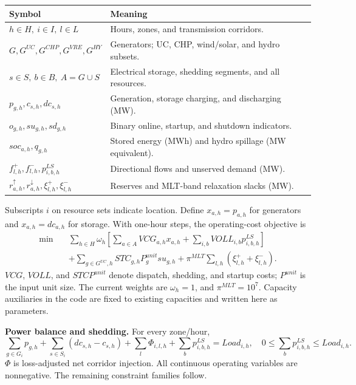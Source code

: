 \documentclass[11pt,a4paper]{article}
\newcommand{\family}[1]{\textbf{#1}}
\begin{document}
\begin{center}\small
\begin{tabularx}{\linewidth}{@{}lX@{}}\toprule
Symbol & Meaning \\\midrule
$h\in H,\ i\in I,\ l\in L$ & Hours, zones, and transmission corridors.\\
$G,G^{UC},G^{CHP},G^{VRE},G^{HY}$ & Generators; UC, CHP, wind/solar, and hydro subsets.\\
$s\in S,\ b\in B,\ A=G\cup S$ & Electrical storage, shedding segments, and all resources.\\
$p_{g,h},c_{s,h},dc_{s,h}$ & Generation, storage charging, and discharging (MW).\\
$o_{g,h},su_{g,h},sd_{g,h}$ & Binary online, startup, and shutdown indicators.\\
$soc_{a,h},q_{g,h}$ & Stored energy (MWh) and hydro spillage (MW equivalent).\\
$f^+_{l,h},f^-_{l,h},p^{LS}_{i,b,h}$ & Directional flows and unserved demand (MW).\\
$r^\uparrow_{a,h},r^\downarrow_{a,h},\xi^+_{l,h},\xi^-_{l,h}$ & Reserves and MLT-band relaxation slacks (MW).\\\bottomrule
\end{tabularx}
\end{center}
Subscripts $i$ on resource sets indicate location. Define $x_{a,h}=p_{a,h}$
for generators and $x_{a,h}=dc_{a,h}$ for storage. With one-hour steps,
the operating-cost objective is
\begin{align}
\min\quad &\sum_{h\in H}\omega_h\left[
\sum_{a\in A}VCG_{a,h}x_{a,h}+\sum_{i,b}VOLL_{i,b}p^{LS}_{i,b,h}\right]
\nonumber\\
&+\sum_{g\in G^{UC},h}STC_{g,h}P_g^{unit}su_{g,h}
+\pi^{MLT}\sum_{l,h}(\xi^+_{l,h}+\xi^-_{l,h}).\label{eq:objective}
\end{align}
$VCG$, $VOLL$, and $STC P^{unit}$ denote dispatch, shedding, and startup
costs; $P^{unit}$ is the input unit size. The current weights are
$\omega_h=1$, and $\pi^{MLT}=10^7$. Capacity auxiliaries in the code are
fixed to existing capacities and written here as parameters.

\family{Power balance and shedding.} For every zone/hour,
\begin{equation}
\sum_{g\in G_i}p_{g,h}+\sum_{s\in S_i}(dc_{s,h}-c_{s,h})
+\sum_l\Phi_{i,l,h}+\sum_b p^{LS}_{i,b,h}=Load_{i,h},
\quad 0\le\sum_b p^{LS}_{i,b,h}\le Load_{i,h}.\label{eq:balance}
\end{equation}
$\Phi$ is loss-adjusted net corridor injection. All continuous operating
variables are nonnegative. The remaining constraint families follow.
\end{document}
